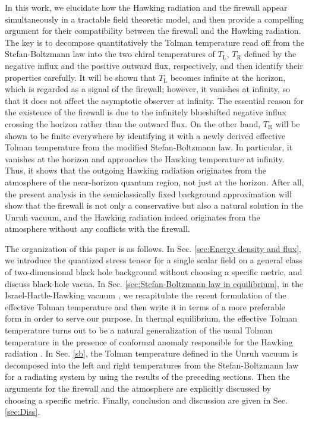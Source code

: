 \documentclass[aps,a4paper,showpacs,showkeys,superscriptaddress,12pt]{revtex4-1}
\begin{document}
In this work, we elucidate how the Hawking radiation and the firewall appear
simultaneously in a tractable field theoretic model,
and then provide a compelling argument for their compatibility between
the firewall and the Hawking radiation.
The key is to decompose quantitatively the Tolman temperature
read off from the Stefan-Boltzmann law
into the two chiral temperatures of $T_\text{L}$, $T_\text{R}$
defined by the negative influx and the positive outward flux, respectively, and then identify
their properties carefully.
It will be shown that $T_\text{L}$ becomes infinite at the horizon, which is regarded as a signal of the
firewall; however, it vanishes at infinity, so that it does not affect the asymptotic observer at infinity.
The essential reason for the existence of the firewall is
due to the infinitely blueshifted negative influx crossing the horizon
rather than the outward flux.
On the other hand, $T_\text{R}$ will be shown to be finite everywhere by identifying it
with a newly derived effective Tolman temperature from the modified Stefan-Boltzmann law.
In particular, it vanishes at the horizon and approaches the Hawking temperature
at infinity. Thus, it shows that the
outgoing Hawking radiation originates from the atmosphere of the near-horizon quantum region,
not just at the horizon.
After all, the present analysis in the semiclassically fixed background approximation will show
that the firewall is not only a conservative but also a natural solution in the Unruh vacuum,
and the Hawking radiation indeed originates from the atmosphere without any conflicts with the firewall.

The organization of this paper is as follows.
In Sec. \ref{sec:Energy density and flux},
we introduce the quantized stress tensor for a single scalar field
on a general class of two-dimensional black hole background without choosing a specific metric,
and discuss black-hole vacua.
In Sec. \ref{sec:Stefan-Boltzmann law in equilibrium},
in the Israel-Hartle-Hawking vacuum \cite{Hartle:1976tp,Israel:1976ur},
we recapitulate the recent formulation of the effective Tolman temperature \cite{Gim:2015era}
and then write it in terms of a more preferable form in order to serve our purpose.
In thermal equilibrium, the effective Tolman temperature turns out to be a natural generalization
of the usual Tolman temperature in the presence of
conformal anomaly \cite{Deser:1976yx} responsible for the Hawking radiation \cite{Christensen:1977jc}.
In Sec. \ref{sb}, the
Tolman temperature defined in the Unruh vacuum is decomposed into the left and right temperatures
from the Stefan-Boltzmann law for a radiating system by using the results of the preceding sections.
Then the arguments for the firewall and the atmosphere
are explicitly discussed by choosing a specific
metric. Finally, conclusion and discussion are given in Sec. \ref{sec:Diss}.
\end{document}
